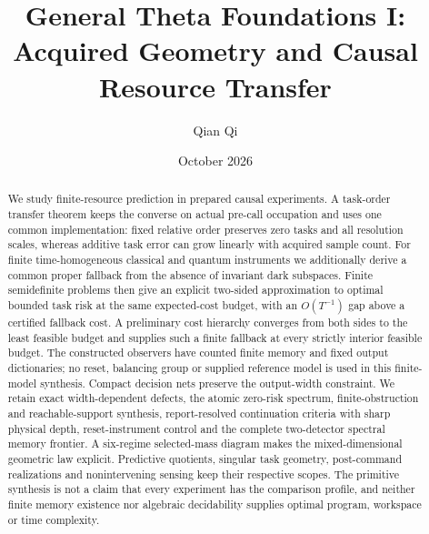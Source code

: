 
\title[Acquired geometry and causal resource transfer]{General Theta Foundations I:\\Acquired Geometry and Causal Resource Transfer}
\author{Qian Qi}\date{October 2026}

\begin{abstract}
We study finite-resource prediction in prepared causal experiments. A task-order transfer theorem keeps the converse on actual pre-call occupation and uses one common implementation: fixed relative order preserves zero tasks and all resolution scales, whereas additive task error can grow linearly with acquired sample count. For finite time-homogeneous classical and quantum instruments we additionally derive a common proper fallback from the absence of invariant dark subspaces. Finite semidefinite problems then give an explicit two-sided approximation to optimal bounded task risk at the same expected-cost budget, with an $O(T^{-1})$ gap above a certified fallback cost. A preliminary cost hierarchy converges from both sides to the least feasible budget and supplies such a finite fallback at every strictly interior feasible budget. The constructed observers have counted finite memory and fixed output dictionaries; no reset, balancing group or supplied reference model is used in this finite-model synthesis. Compact decision nets preserve the output-width constraint. We retain exact width-dependent defects, the atomic zero-risk spectrum, finite-obstruction and reachable-support synthesis, report-resolved continuation criteria with sharp physical depth, reset-instrument control and the complete two-detector spectral memory frontier. A six-regime selected-mass diagram makes the mixed-dimensional geometric law explicit. Predictive quotients, singular task geometry, post-command realizations and nonintervening sensing keep their respective scopes. The primitive synthesis is not a claim that every experiment has the comparison profile, and neither finite memory existence nor algebraic decidability supplies optimal program, workspace or time complexity.
\end{abstract}
\maketitle
